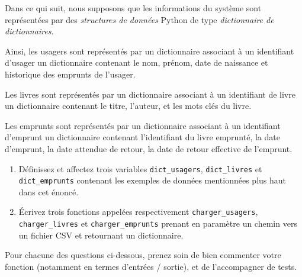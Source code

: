 \documentclass[10pt,a4paper]{sujets-exercices}
\begin{document}
Dans ce qui suit, nous supposons que les informations du système sont représentées par des \emph{structures de données} Python de type \emph{dictionnaire de dictionnaires}.

Ainsi, les usagers sont représentés par un dictionnaire associant à un identifiant d'usager un dictionnaire contenant le nom, prénom, date de naissance et historique des emprunts de l'usager.

Les livres sont représentés par un dictionnaire associant à un identifiant de livre un dictionnaire contenant le titre, l'auteur, et les mots clés du livre.

Les emprunts sont représentés par un dictionnaire associant à un identifiant d'emprunt un dictionnaire contenant l'identifiant du livre emprunté, la date d'emprunt, la date attendue de retour, la date de retour effective de l'emprunt.

\begin{enumerate}
\item Définissez et affectez trois variables \texttt{dict\_usagers}, \texttt{dict\_livres} et \texttt{dict\_emprunts} contenant les exemples de données mentionnées plus haut dans cet énoncé.
\item Écrivez trois fonctions appelées respectivement \texttt{charger\_usagers}, \texttt{charger\_livres} et \texttt{charger\_emprunts} prenant en paramètre un chemin vers un fichier CSV et retournant un dictionnaire.
\end{enumerate}


Pour chacune des questions ci-dessous, prenez soin de bien commenter votre fonction (notamment en termes d'entrées / sortie), et de l'accompagner de tests.
\end{document}
